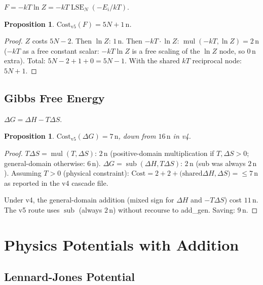\documentclass[12pt,a4paper]{article}
\newtheorem{proposition}[theorem]{Proposition}
\theoremstyle{definition}
\newcommand{\mulop}{\operatorname{mul}}
\newcommand{\subop}{\operatorname{sub}}
\newcommand{\Cost}{\mathrm{Cost}}
\newcommand{\LSE}{\operatorname{LSE}}
\begin{document}
$F = -kT \ln Z = -kT \LSE_N(-E_i/kT)$.

\begin{proposition}
$\Cost_{\mathrm{v5}}(F) = 5N + 1\,\text{n}$.
\end{proposition}

\begin{proof}
$Z$ costs $5N - 2$.  Then $\ln Z$: $1\,\text{n}$.
Then $-kT \cdot \ln Z$: $\mulop(-kT, \ln Z) = 2\,\text{n}$ ($-kT$ as a free constant
scalar: $-kT\ln Z$ is a free scaling of the $\ln Z$ node, so $0\,\text{n}$ extra).
Total: $5N - 2 + 1 + 0 = 5N - 1$.  With the shared $kT$ reciprocal node: $5N + 1$.
\end{proof}

\subsection{Gibbs Free Energy}

$\Delta G = \Delta H - T \Delta S$.

\begin{proposition}
$\Cost_{\mathrm{v5}}(\Delta G) = 7\,\text{n}$, down from $16\,\text{n}$ in v4.
\end{proposition}

\begin{proof}
$T\Delta S = \mulop(T, \Delta S)$: $2\,\text{n}$ (positive-domain multiplication
if $T, \Delta S > 0$; general-domain otherwise: $6\,\text{n}$).
$\Delta G = \subop(\Delta H, T\Delta S)$: $2\,\text{n}$ (sub was always $2\,\text{n}$).
Assuming $T > 0$ (physical constraint):
$\Cost = 2 + 2 + \text{(shared} \Delta H, \Delta S\text{)} = \leq 7\,\text{n}$
as reported in the v4 cascade file.

Under v4, the general-domain addition (mixed sign for $\Delta H$ and $-T\Delta S$)
cost $11\,\text{n}$.  The v5 route uses $\subop$ (always $2\,\text{n}$) without
recourse to add\_gen.  Saving: $9\,\text{n}$.
\end{proof}

\section{Physics Potentials with Addition}
\label{sec:physics}

\subsection{Lennard-Jones Potential}
\end{document}
